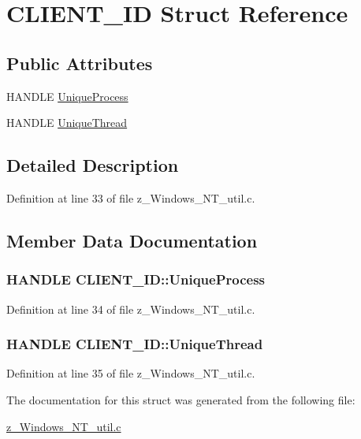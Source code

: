 \hypertarget{structCLIENT__ID}{\section{C\-L\-I\-E\-N\-T\-\_\-\-I\-D Struct Reference}
\label{structCLIENT__ID}
}
\subsection*{Public Attributes}
\begin{DoxyCompactItemize}
\item 
H\-A\-N\-D\-L\-E \hyperlink{structCLIENT__ID_a49bc0496fea8ea6523f4eb37fb739a89}{Unique\-Process}
\item 
H\-A\-N\-D\-L\-E \hyperlink{structCLIENT__ID_af4423c30ef34cc546bbc23a7c783e6e3}{Unique\-Thread}
\end{DoxyCompactItemize}


\subsection{Detailed Description}


Definition at line 33 of file z\-\_\-\-Windows\-\_\-\-N\-T\-\_\-util.\-c.



\subsection{Member Data Documentation}
\hypertarget{structCLIENT__ID_a49bc0496fea8ea6523f4eb37fb739a89}{
\subsubsection[{Unique\-Process}]{\setlength{\rightskip}{0pt plus 5cm}H\-A\-N\-D\-L\-E C\-L\-I\-E\-N\-T\-\_\-\-I\-D\-::\-Unique\-Process}}\label{structCLIENT__ID_a49bc0496fea8ea6523f4eb37fb739a89}


Definition at line 34 of file z\-\_\-\-Windows\-\_\-\-N\-T\-\_\-util.\-c.

\hypertarget{structCLIENT__ID_af4423c30ef34cc546bbc23a7c783e6e3}{
\subsubsection[{Unique\-Thread}]{\setlength{\rightskip}{0pt plus 5cm}H\-A\-N\-D\-L\-E C\-L\-I\-E\-N\-T\-\_\-\-I\-D\-::\-Unique\-Thread}}\label{structCLIENT__ID_af4423c30ef34cc546bbc23a7c783e6e3}


Definition at line 35 of file z\-\_\-\-Windows\-\_\-\-N\-T\-\_\-util.\-c.



The documentation for this struct was generated from the following file\-:\begin{DoxyCompactItemize}
\item 
\hyperlink{z__Windows__NT__util_8c}{z\-\_\-\-Windows\-\_\-\-N\-T\-\_\-util.\-c}\end{DoxyCompactItemize}
